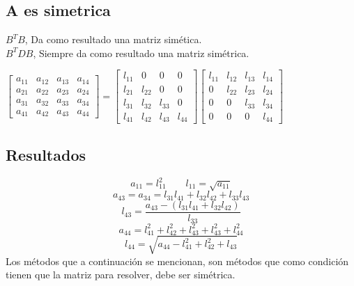 \subsection*{A es simetrica}
$B^TB$, Da como resultado una matriz sim\'etica. \\
$B^TDB$, Siempre da como resultado una matriz sim\'etrica.
\begin{center}
$\begin{bmatrix}
a_{11} & a_{12} & a_{13} & a_{14} \\
a_{21} & a_{22} & a_{23} & a_{24} \\
a_{31} & a_{32} & a_{33} & a_{34} \\
a_{41} & a_{42} & a_{43} & a_{44} 
\end{bmatrix}=\begin{bmatrix}
l_{11} & 0 & 0 & 0 \\
l_{21} & l_{22} & 0 & 0 \\
l_{31} & l_{32} & l_{33} & 0 \\
l_{41} & l_{42} & l_{43} & l_{44} 
\end{bmatrix}\begin{bmatrix}
l_{11} & l_{12} & l_{13} & l_{14} \\
0 & l_{22} & l_{23} & l_{24} \\
0 & 0 & l_{33} & l_{34} \\
0 & 0 & 0 & l_{44} 
\end{bmatrix} $
\end{center}
\subsection*{Resultados}
\begin{displaymath}a_{11}=l_{11}^2 \qquad l_{11}=\sqrt{a_{11}}\end{displaymath}
\begin{displaymath}a_{43}=a_{34}=l_{31}l_{41}+l_{32}l_{42}+l_{33}l_{43}\end{displaymath}
\begin{displaymath}l_{43}=\frac{a_{43}-(l_{31}l_{41}+l_{32}l_{42})}{l_{33}}\end{displaymath}
\begin{displaymath}a_{44}=l_{41}^2+l_{42}^2+l_{43}^2+l_{43}^2+l_{44}^2\end{displaymath}
\begin{displaymath}l_{44}=\sqrt{a_{44}-l_{41}^2+l_{42}^2+l_{43}}\end{displaymath}
Los m\'etodos que a continuaci\'on se mencionan, son m\'etodos que como condici\'on tienen que la matriz para resolver, debe ser sim\'etrica.

